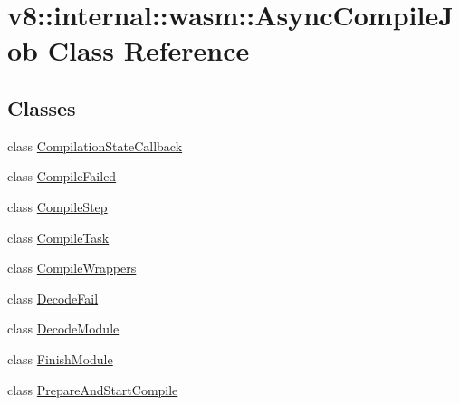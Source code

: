 \hypertarget{classv8_1_1internal_1_1wasm_1_1AsyncCompileJob}{}\section{v8\+:\+:internal\+:\+:wasm\+:\+:Async\+Compile\+Job Class Reference}
\label{classv8_1_1internal_1_1wasm_1_1AsyncCompileJob}
\subsection*{Classes}
\begin{DoxyCompactItemize}
\item 
class \mbox{\hyperlink{classv8_1_1internal_1_1wasm_1_1AsyncCompileJob_1_1CompilationStateCallback}{Compilation\+State\+Callback}}
\item 
class \mbox{\hyperlink{classv8_1_1internal_1_1wasm_1_1AsyncCompileJob_1_1CompileFailed}{Compile\+Failed}}
\item 
class \mbox{\hyperlink{classv8_1_1internal_1_1wasm_1_1AsyncCompileJob_1_1CompileStep}{Compile\+Step}}
\item 
class \mbox{\hyperlink{classv8_1_1internal_1_1wasm_1_1AsyncCompileJob_1_1CompileTask}{Compile\+Task}}
\item 
class \mbox{\hyperlink{classv8_1_1internal_1_1wasm_1_1AsyncCompileJob_1_1CompileWrappers}{Compile\+Wrappers}}
\item 
class \mbox{\hyperlink{classv8_1_1internal_1_1wasm_1_1AsyncCompileJob_1_1DecodeFail}{Decode\+Fail}}
\item 
class \mbox{\hyperlink{classv8_1_1internal_1_1wasm_1_1AsyncCompileJob_1_1DecodeModule}{Decode\+Module}}
\item 
class \mbox{\hyperlink{classv8_1_1internal_1_1wasm_1_1AsyncCompileJob_1_1FinishModule}{Finish\+Module}}
\item 
class \mbox{\hyperlink{classv8_1_1internal_1_1wasm_1_1AsyncCompileJob_1_1PrepareAndStartCompile}{Prepare\+And\+Start\+Compile}}
\end{DoxyCompactItemize}
